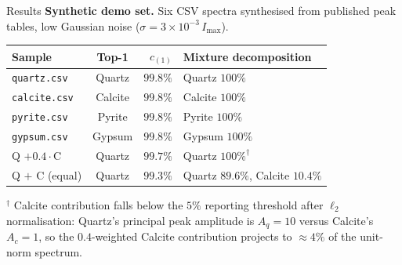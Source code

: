 \documentclass[10pt,aspectratio=169]{beamer}
\newcommand{\code}[1]{\texttt{\small #1}}
\begin{document}
\begin{frame}{Results}
\textbf{Synthetic demo set.} Six CSV spectra synthesised from published peak
tables, low Gaussian noise ($\sigma = 3\!\times\!10^{-3}\,I_{\max}$).
\smallskip

\centering\small
\begin{tabular}{@{}lcrl@{}}
\toprule
Sample & Top-1 & $c_{(1)}$ & Mixture decomposition\\
\midrule
\code{quartz.csv}            & Quartz   & $99.8\%$ & Quartz $100\%$\\
\code{calcite.csv}           & Calcite  & $99.8\%$ & Calcite $100\%$\\
\code{pyrite.csv}            & Pyrite   & $99.8\%$ & Pyrite $100\%$\\
\code{gypsum.csv}            & Gypsum   & $99.8\%$ & Gypsum $100\%$\\
Q $+ 0.4{\cdot}$C            & Quartz   & $99.7\%$ & Quartz $100\%^{\dagger}$\\
Q $+$ C (equal)              & Quartz   & $99.3\%$ & Quartz $89.6\%$, Calcite $10.4\%$\\
\bottomrule
\end{tabular}
\smallskip

\raggedright\footnotesize
$^{\dagger}$ Calcite contribution falls below the $5\%$ reporting threshold
after $\ell_{2}$ normalisation: Quartz's principal peak amplitude is $A_{q} \!=\! 10$
versus Calcite's $A_{c} \!=\! 1$, so the $0.4$-weighted Calcite contribution
projects to $\approx 4\%$ of the unit-norm spectrum.
\end{frame}
\end{document}
